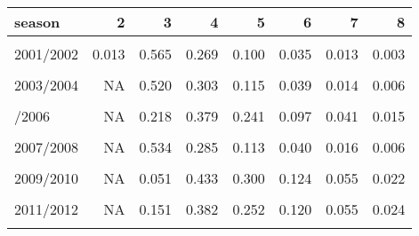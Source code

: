 \begin{table}[!h]
\centering
\begin{tabular}{lrrrrrrr}
\toprule
season & 2 & 3 & 4 & 5 & 6 & 7 & 8\\
\midrule
\cellcolor{gray!10}{2000/2001} & \cellcolor{gray!10}{0.120} & \cellcolor{gray!10}{0.510} & \cellcolor{gray!10}{0.243} & \cellcolor{gray!10}{0.078} & \cellcolor{gray!10}{0.030} & \cellcolor{gray!10}{0.011} & \cellcolor{gray!10}{0.005}\\
2001/2002 & 0.013 & 0.565 & 0.269 & 0.100 & 0.035 & 0.013 & 0.003\\
\cellcolor{gray!10}{2002/2003} & \cellcolor{gray!10}{0.335} & \cellcolor{gray!10}{0.370} & \cellcolor{gray!10}{0.156} & \cellcolor{gray!10}{0.076} & \cellcolor{gray!10}{0.037} & \cellcolor{gray!10}{0.014} & \cellcolor{gray!10}{0.007}\\
2003/2004 & NA & 0.520 & 0.303 & 0.115 & 0.039 & 0.014 & 0.006\\
\cellcolor{gray!10}{2004/2005} & \cellcolor{gray!10}{0.002} & \cellcolor{gray!10}{0.512} & \cellcolor{gray!10}{0.288} & \cellcolor{gray!10}{0.122} & \cellcolor{gray!10}{0.048} & \cellcolor{gray!10}{0.018} & \cellcolor{gray!10}{0.007}\\
\addlinespace
2005/2006 & NA & 0.218 & 0.379 & 0.241 & 0.097 & 0.041 & 0.015\\
\cellcolor{gray!10}{2006/2007} & \cellcolor{gray!10}{NA} & \cellcolor{gray!10}{0.017} & \cellcolor{gray!10}{0.299} & \cellcolor{gray!10}{0.285} & \cellcolor{gray!10}{0.179} & \cellcolor{gray!10}{0.107} & \cellcolor{gray!10}{0.061}\\
2007/2008 & NA & 0.534 & 0.285 & 0.113 & 0.040 & 0.016 & 0.006\\
\cellcolor{gray!10}{2008/2009} & \cellcolor{gray!10}{NA} & \cellcolor{gray!10}{0.172} & \cellcolor{gray!10}{0.372} & \cellcolor{gray!10}{0.238} & \cellcolor{gray!10}{0.120} & \cellcolor{gray!10}{0.057} & \cellcolor{gray!10}{0.026}\\
2009/2010 & NA & 0.051 & 0.433 & 0.300 & 0.124 & 0.055 & 0.022\\
\addlinespace
\cellcolor{gray!10}{2010/2011} & \cellcolor{gray!10}{NA} & \cellcolor{gray!10}{0.278} & \cellcolor{gray!10}{0.322} & \cellcolor{gray!10}{0.201} & \cellcolor{gray!10}{0.103} & \cellcolor{gray!10}{0.051} & \cellcolor{gray!10}{0.024}\\
2011/2012 & NA & 0.151 & 0.382 & 0.252 & 0.120 & 0.055 & 0.024\\
\cellcolor{gray!10}{2012/2013} & \cellcolor{gray!10}{NA} & \cellcolor{gray!10}{0.023} & \cellcolor{gray!10}{0.312} & \cellcolor{gray!10}{0.289} & \cellcolor{gray!10}{0.184} & \cellcolor{gray!10}{0.105} & \cellcolor{gray!10}{0.048}\\

\end{tabular}
\end{table}

